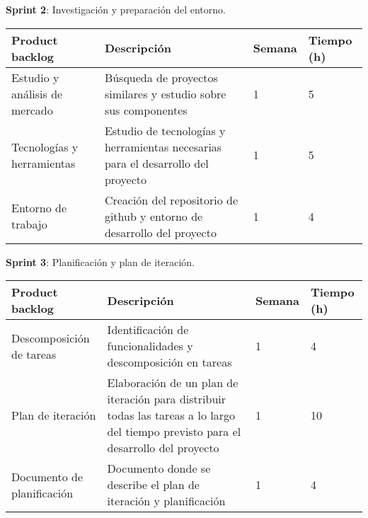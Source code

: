 \textbf{Sprint 2}: Investigación y preparación del entorno.

\begin{table}[h!]
\begin{tabular}{|p{4cm}|p{7.2cm}|p{1.3cm}|p{2.1cm}|}
\hline
\rowcolor[HTML]{9B9B9B} 
{\color[HTML]{FFFFFF} Product backlog} & {\color[HTML]{FFFFFF} Descripción}                                  & {\color[HTML]{FFFFFF} Semana} & {\color[HTML]{FFFFFF}Tiempo (h)} \\ \hline
Estudio y análisis de mercado                             & Búsqueda de proyectos similares y estudio sobre sus componentes
                                        & 1                             & 5                                    \\ \hline
Tecnologías y herramientas                        & Estudio de tecnologías y herramientas necesarias para el desarrollo del proyecto
                                  & 1                             & 5                                   \\ \hline
Entorno de trabajo                          & Creación del repositorio de github y entorno de desarrollo del proyecto
          & 1                             & 4                                   \\ \hline
\end{tabular}
\end{table}

\newpage

\textbf{Sprint 3}: Planificación y plan de iteración.


\begin{table}[h!]
\begin{tabular}{|p{4cm}|p{7.2cm}|p{1.3cm}|p{2.1cm}|}
\hline
\rowcolor[HTML]{9B9B9B} 
{\color[HTML]{FFFFFF} Product backlog} & {\color[HTML]{FFFFFF} Descripción}                                  & {\color[HTML]{FFFFFF} Semana} & {\color[HTML]{FFFFFF}Tiempo (h)} \\ \hline
Descomposición de tareas                             & Identificación de funcionalidades y descomposición en tareas
                                        & 1                             & 4                                   \\ \hline
Plan de iteración                        & Elaboración de un plan de iteración para distribuir todas las tareas a lo largo del tiempo previsto para el desarrollo del proyecto
                                  & 1                             & 10                                  \\ \hline
Documento de planificación                          & Documento donde se describe el plan de iteración y planificación
          & 1                             & 4                                   \\ \hline
\end{tabular}
\end{table}


